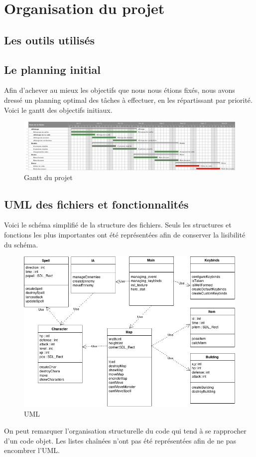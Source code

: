 \section{Organisation du projet}

\subsection{Les outils utilisés}


\subsection{Le planning initial}

Afin d'achever au mieux les objectifs que nous nous étions fixés, nous avons dressé un planning optimal des tâches à effectuer, en les répartissant par priorité. Voici le gantt des objectifs initiaux.

\begin{figure}[!ht]
    \includegraphics[width=1.1\textwidth]{./images/gantt.png}
    \caption{Gantt du projet}
\end{figure}

\subsection{UML des fichiers et fonctionnalités}

Voici le schéma simplifié de la structure des fichiers. Seuls les structures et fonctions les plus importantes ont été représentées afin de conserver la lisibilité du schéma. 

\begin{figure}[!ht]
    \includegraphics[width=1\textwidth]{./images/uml.png}
    \caption{UML}
\end{figure}

On peut remarquer l'organisation structurelle du code qui tend à se rapprocher d'un code objet. Les listes chaînées n'ont pas été représentées afin de ne pas encombrer l'UML.

